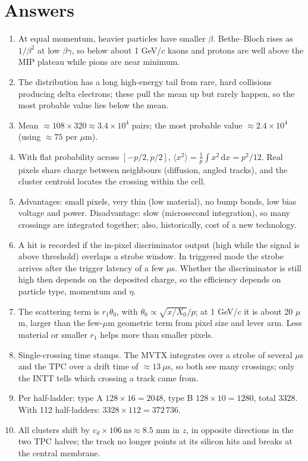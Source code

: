 \documentclass[11pt,letterpaper]{article}
\begin{document}
\section{Answers}
\begin{enumerate}
\item At equal momentum, heavier particles have smaller $\beta$. Bethe--Bloch rises as $1/\beta^2$ at low $\beta\gamma$, so below about 1 GeV/$c$ kaons and protons are well above the MIP plateau while pions are near minimum.
\item The distribution has a long high-energy tail from rare, hard collisions producing delta electrons; these pull the mean up but rarely happen, so the most probable value lies below the mean.
\item Mean $\approx108\times320\approx3.4\times10^4$ pairs; the most probable value $\approx2.4\times10^4$ (using $\approx75$ per $\mu$m).
\item With flat probability across $[-p/2,p/2]$, $\langle x^2\rangle=\frac1p\int x^2\,\mathrm{d}x=p^2/12$. Real pixels share charge between neighbours (diffusion, angled tracks), and the cluster centroid locates the crossing within the cell.
\item Advantages: small pixels, very thin (low material), no bump bonds, low bias voltage and power. Disadvantage: slow (microsecond integration), so many crossings are integrated together; also, historically, cost of a new technology.
\item A hit is recorded if the in-pixel discriminator output (high while the signal is above threshold) overlaps a strobe window. In triggered mode the strobe arrives after the trigger latency of a few $\mu$s. Whether the discriminator is still high then depends on the deposited charge, so the efficiency depends on particle type, momentum and $\eta$.
\item The scattering term is $r_1\theta_0$, with $\theta_0\propto\sqrt{x/X_0}/p$; at 1 GeV/$c$ it is about 20 $\mu$m, larger than the few-$\mu$m geometric term from pixel size and lever arm. Less material or smaller $r_1$ helps more than smaller pixels.
\item Single-crossing time stamps. The MVTX integrates over a strobe of several $\mu$s and the TPC over a drift time of $\approx13\ \mu$s, so both see many crossings; only the INTT tells which crossing a track came from.
\item Per half-ladder: type A $128\times16=2048$, type B $128\times10=1280$, total 3328. With 112 half-ladders: $3328\times112=372\,736$.
\item All clusters shift by $v_d\times106\ \mathrm{ns}\approx8.5$ mm in $z$, in opposite directions in the two TPC halves; the track no longer points at its silicon hits and breaks at the central membrane.

\end{enumerate}
\end{document}
